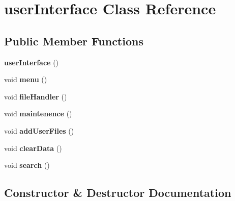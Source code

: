 \section{user\+Interface Class Reference}
\label{classuser_interface}
\subsection*{Public Member Functions}
\begin{DoxyCompactItemize}
\item 
{\bf user\+Interface} ()
\item 
void {\bfseries menu} ()\label{classuser_interface_a749647fc96b7d6183f172b2477019b6f}

\item 
void {\bfseries file\+Handler} ()\label{classuser_interface_a30de9d3694761c1057ad89eb4b7ecd99}

\item 
void {\bfseries maintenence} ()\label{classuser_interface_a2f0cfe4b8dafe9d2c3d18cd618a58408}

\item 
void {\bfseries add\+User\+Files} ()\label{classuser_interface_a14b008db1bc3e8dabaaac30b7abd0059}

\item 
void {\bfseries clear\+Data} ()\label{classuser_interface_a7e5279e745e02ace19344bde1bb141ed}

\item 
void {\bfseries search} ()\label{classuser_interface_afe1449a33f038a35d08cec62b7927434}

\end{DoxyCompactItemize}


\subsection{Constructor \& Destructor Documentation}
